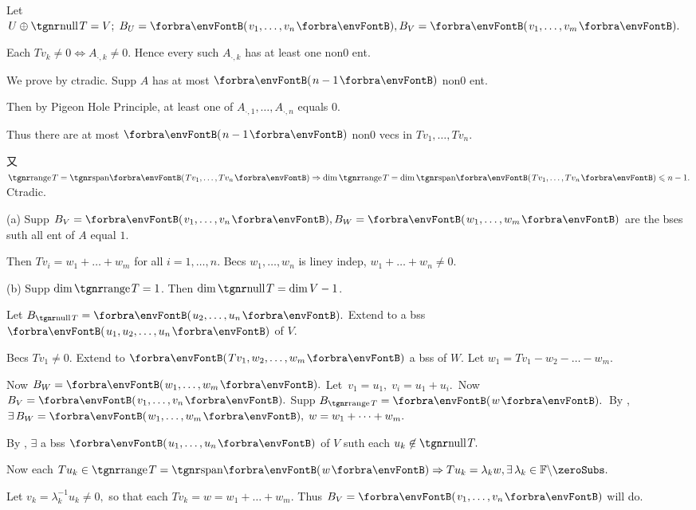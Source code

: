 \par\quad
Let $U\oplus\null T=V;\;B_U=\Par{v_1,\dots,v_n},B_V=\Par{v_1,\dots,v_m}.$\par\quad
Each $Tv_k\neq 0\Longleftrightarrow A_{\cdot,k}\neq 0.$ Hence every such $A_{\cdot,k}$ has at least one non0 ent.\PfEnd\vspace{4pt}\par\quad
\Or We prove by ctradic. Supp $A$ has at most $\Par{n-1}$ non0 ent.\par\quad
Then by Pigeon Hole Principle, at least one of $A_{\cdot,1},\dots,A_{\cdot,n}$ equals $0$.\par\quad
Thus there are at most $\Par{n-1}$ non0 vecs in $Tv_{1},\dots,Tv_n.$\par\quad
又 $\range T=\Span{Tv_{1},\dots,Tv_n}\Rightarrow\dim\range T=\dim\Span{Tv_{1},\dots,Tv_n}\leqslant n-1.$ Ctradic.\PfEnd
\SepLine

\par\quad
(a) Supp $B_V=\Par{v_1,\dots,v_n},B_W=\Par{w_1,\dots,w_m}$ are the bses suth all ent of $A$ equal $1$.\par\quad\Ha
Then $Tv_i=w_1+\dots+w_m$ for all $i=1,\dots,n$. Becs $w_1,\dots,w_n$ is liney indep, $w_1+\dots+w_n\neq 0.$\vspace{4pt}\par\quad
(b) Supp $\dim\range T=1$. Then $\dim\null T=\dim V-1$.\par\quad\Hb
Let $B_{\null T}=\Par{u_2,\dots,u_n}.$ Extend to a bss $\Par{u_1,u_2,\dots,u_n}$ of $V.$\par\quad\Hb
Becs $Tv_1\neq 0.$ Extend to $\Par{Tv_1,w_2,\dots,w_m}$ a bss of $W.$ Let $w_1=Tv_1-w_2-\dots-w_m.$\par\quad\Hb
Now $B_W=\Par{w_1,\dots,w_m}.$ \;Let \,$v_1=u_1,\;v_i=u_1+u_i.$ \,Now $B_V=\Par{v_1,\dots,v_n}.$\PfEnd\vspace{6pt}\quad\Hb
\Or Supp $B_{\range T}=\Par{w}.$ \,By , $\exists\,B_W=\Par{w_1,\dots,w_m},\;w=w_1+\dots+w_m.$\par\quad\Hb
By , $\exists$ a bss $\Par{u_1,\dots,u_n}$ of $V$ suth each $u_k\not\in\null T.$\par\quad\Hb
Now each $Tu_k\in\range T=\Span{w}\Rightarrow Tu_k=\lambda_k w,\exists\,\lambda_k\in\nonzeroFbb.$\par\quad\Hb
Let $v_k=\lambda_k^{-1}u_k\neq 0,$ so that each $Tv_k=w=w_1+\dots+w_m.$ Thus $B_V=\Par{v_1,\dots,v_n}$ will do.\PfEnd
\SepLine

